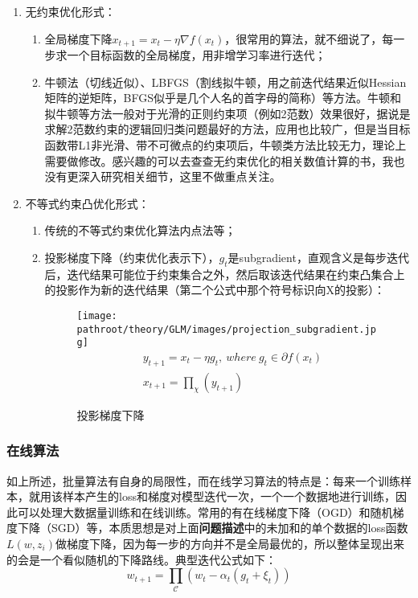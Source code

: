 \documentclass[10pt,a4paper]{ctexbook}
\providecommand{\pathroot}{../..}
\begin{document}
\begin{enumerate}
\item 无约束优化形式：
    \begin{enumerate}
    \item 全局梯度下降$x_{t+1}=x_{t}-\eta\nabla{f(x_{t})}$，很常用的算法，就不细说了，每一步求一个目标函数的全局梯度，用非增学习率进行迭代；
    \item 牛顿法（切线近似）、LBFGS（割线拟牛顿，用之前迭代结果近似Hessian矩阵的逆矩阵，BFGS似乎是几个人名的首字母的简称）等方法。牛顿和拟牛顿等方法一般对于光滑的正则约束项（例如2范数）效果很好，据说是求解2范数约束的逻辑回归类问题最好的方法，应用也比较广，但是当目标函数带L1非光滑、带不可微点的约束项后，牛顿类方法比较无力，理论上需要做修改。感兴趣的可以去查查无约束优化的相关数值计算的书，我也没有更深入研究相关细节，这里不做重点关注。
    \end{enumerate}

\item 不等式约束凸优化形式：
    \begin{enumerate}
    \item 传统的不等式约束优化算法内点法等；
    \item 投影梯度下降（约束优化表示下），$g_{t}$是subgradient，直观含义是每步迭代后，迭代结果可能位于约束集合之外，然后取该迭代结果在约束凸集合上的投影作为新的迭代结果（第二个公式中那个符号标识向X的投影）：
        \begin{figure}[ht]
            \centering
            \texttt{[image: \\pathroot/theory/GLM/images/projection\_subgradient.jpg]}
            \begin{align*}
            & y_{t+1}=x_{t}-\eta g_{t},\ where\ g_{t} \in \partial{f(x_{t})} \\
            & x_{t+1}=\prod_{\chi}(y_{t+1})
            \end{align*}
            \caption{投影梯度下降}
            \label{fig:projection_subgradient}
        \end{figure}
    \end{enumerate}
\end{enumerate}

\subsubsection{在线算法}
如上所述，批量算法有自身的局限性，而在线学习算法的特点是：每来一个训练样本，就用该样本产生的loss和梯度对模型迭代一次，一个一个数据地进行训练，因此可以处理大数据量训练和在线训练。常用的有在线梯度下降（OGD）和随机梯度下降（SGD）等，本质思想是对上面\textbf{问题描述}中的未加和的单个数据的loss函数$L(w, z_{i})$做梯度下降，因为每一步的方向并不是全局最优的，所以整体呈现出来的会是一个看似随机的下降路线。典型迭代公式如下：
\[
w_{t+1}=\prod_{\mathcal{C}}(w_{t}-\alpha_{t}(g_{t}+\xi_{t}))
\]
\end{document}

